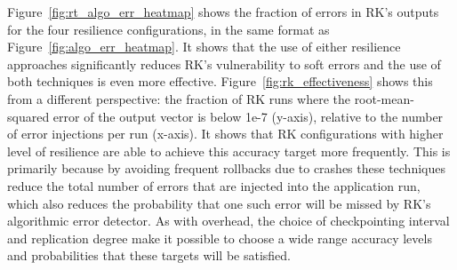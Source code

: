 \documentclass{sig-alternate}
\begin{document}
Figure~\ref{fig:rt_algo_err_heatmap} shows the fraction of errors in RK's outputs for the four resilience configurations, in the same format as Figure~\ref{fig:algo_err_heatmap}.
It shows that the use of either resilience approaches significantly reduces RK's vulnerability to soft errors and the use of both techniques is even more effective.
Figure~\ref{fig:rk_effectiveness} shows this from a different perspective: the fraction of RK runs where the root-mean-squared error of the output vector is below 1e-7 (y-axis), relative to the number of error injections per run (x-axis).
It shows that RK configurations with higher level of resilience are able to achieve this accuracy target more frequently.
This is primarily because by avoiding frequent rollbacks due to crashes these techniques reduce the total number of errors that are injected into the application run, which also reduces the probability that one such error will be missed by RK's algorithmic error detector.
As with overhead, the choice of checkpointing interval and replication degree make it possible to choose a wide range accuracy levels and probabilities that these targets will be satisfied.
\end{document}
